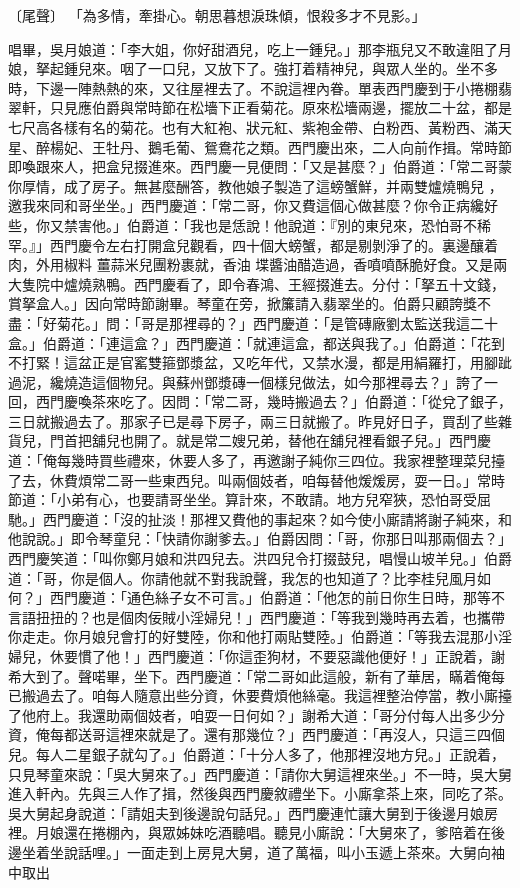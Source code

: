 〔尾聲〕  「為多情，牽掛心。朝思暮想淚珠傾，恨殺多才不見影。」

唱畢，吳月娘道：「李大姐，你好甜酒兒，吃上一鍾兒。」那李瓶兒又不敢違阻了月娘，拏起鍾兒來。咽了一口兒，又放下了。強打着精神兒，與眾人坐的。坐不多時，下邊一陣熱熱的來，又往屋裡去了。不說這裡內眷。單表西門慶到于小捲棚翡翠軒，只見應伯爵與常時節在松墻下正看菊花。原來松墻兩邊，擺放二十盆，都是七尺高各樣有名的菊花。也有大紅袍、狀元紅、紫袍金帶、白粉西、黃粉西、滿天星、醉楊妃、王牡丹、鵝毛葡、鴛鴦花之類。西門慶出來，二人向前作揖。常時節即喚跟來人，把盒兒掇進來。西門慶一見便問：「又是甚麼？」伯爵道：「常二哥蒙你厚情，成了房子。無甚麼酬答，教他娘子製造了這螃蟹鮮，并兩雙爐燒鴨兒 ，邀我來同和哥坐坐。」西門慶道：「常二哥，你又費這個心做甚麼？你令正病纔好些，你又禁害他。」伯爵道：「我也是恁說！他說道：『別的東兒來，恐怕哥不稀罕。』」西門慶令左右打開盒兒觀看，四十個大螃蟹，都是剔剝淨了的。裏邊釀着肉，外用椒料 薑蒜米兒團粉裹就，香油 堞醬油醋造過，香噴噴酥脆好食。又是兩大隻院中爐燒熟鴨。西門慶看了，即令春鴻、王經掇進去。分付：「拏五十文錢，賞拏盒人。」因向常時節謝畢。琴童在旁，掀簾請入翡翠坐的。伯爵只顧誇獎不盡：「好菊花。」問：「哥是那裡尋的？」西門慶道：「是管磚廠劉太監送我這二十盒。」伯爵道：「連這盒？」西門慶道：「就連這盒，都送與我了。」伯爵道：「花到不打緊！這盆正是官窰雙箍鄧漿盆，又吃年代，又禁水漫，都是用絹羅打，用腳跐過泥，纔燒造這個物兒。與蘇州鄧漿磚一個樣兒做法，如今那裡尋去？」誇了一回，西門慶喚茶來吃了。因問：「常二哥，幾時搬過去？」伯爵道：「從兌了銀子，三日就搬過去了。那家子已是尋下房子，兩三日就搬了。昨見好日子，買刮了些雜貨兒，門首把舖兒也開了。就是常二嫂兄弟，替他在舖兒裡看銀子兒。」西門慶道：「俺每幾時買些禮來，休要人多了，再邀謝子純你三四位。我家裡整理菜兒擡了去，休費煩常二哥一些東西兒。叫兩個妓者，咱每替他煖煖房，耍一日。」常時節道：「小弟有心，也要請哥坐坐。算計來，不敢請。地方兒窄狹，恐怕哥受屈馳。」西門慶道：「沒的扯淡！那裡又費他的事起來？如今使小廝請將謝子純來，和他說說。」即令琴童兒：「快請你謝爹去。」伯爵因問：「哥，你那日叫那兩個去？」西門慶笑道：「叫你鄭月娘和洪四兒去。洪四兒令打掇鼓兒，唱慢山坡羊兒。」伯爵道：「哥，你是個人。你請他就不對我說聲，我怎的也知道了？比李桂兒風月如何？」西門慶道：「通色絲子女不可言。」伯爵道：「他怎的前日你生日時，那等不言語扭扭的？也是個肉佞賊小淫婦兒！」西門慶道：「等我到幾時再去着，也攜帶你走走。你月娘兒會打的好雙陸，你和他打兩貼雙陸。」伯爵道：「等我去混那小淫婦兒，休要慣了他！」西門慶道：「你這歪狗材，不要惡識他便好！」正說着，謝希大到了。聲喏畢，坐下。西門慶道：「常二哥如此這般，新有了華居，瞞着俺每已搬過去了。咱每人隨意出些分資，休要費煩他絲毫。我這裡整治停當，教小廝擡了他府上。我還助兩個妓者，咱耍一日何如？」謝希大道：「哥分付每人出多少分資，俺每都送哥這裡來就是了。還有那幾位？」西門慶道：「再沒人，只這三四個兒。每人二星銀子就勾了。」伯爵道：「十分人多了，他那裡沒地方兒。」正說着，只見琴童來說：「吳大舅來了。」西門慶道：「請你大舅這裡來坐。」不一時，吳大舅進入軒內。先與三人作了揖，然後與西門慶敘禮坐下。小廝拿茶上來，同吃了茶。吳大舅起身說道：「請姐夫到後邊說句話兒。」西門慶連忙讓大舅到于後邊月娘房裡。月娘還在捲棚內，與眾姊妹吃酒聽唱。聽見小廝說：「大舅來了，爹陪着在後邊坐着坐說話哩。」一面走到上房見大舅，道了萬福，叫小玉遞上茶來。大舅向袖中取出